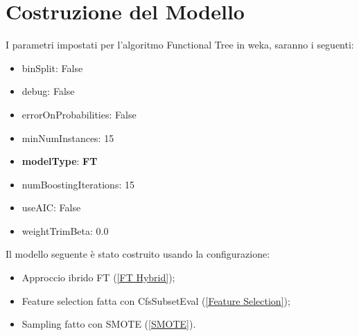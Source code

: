 \section{Costruzione del Modello}
I parametri impostati per l'algoritmo Functional Tree in weka, saranno i seguenti:
\begin{multicols}{2}
\begin{itemize}
	\item binSplit: False
	\item debug: False
	\item errorOnProbabilities: False
	\item minNumInstances: 15
	\item \textbf{modelType}: \textbf{FT}
	\item numBoostingIterations: 15
	\item useAIC: False
	\item weightTrimBeta: 0.0
\end{itemize}
\end{multicols}
Il modello seguente è stato costruito usando la configurazione:
\begin{itemize}
	\item Approccio ibrido FT (\ref{FT Hybrid});
	\item Feature selection fatta con CfsSubsetEval (\ref{Feature Selection});
	\item Sampling fatto con SMOTE (\ref{SMOTE}).
\end{itemize}	
